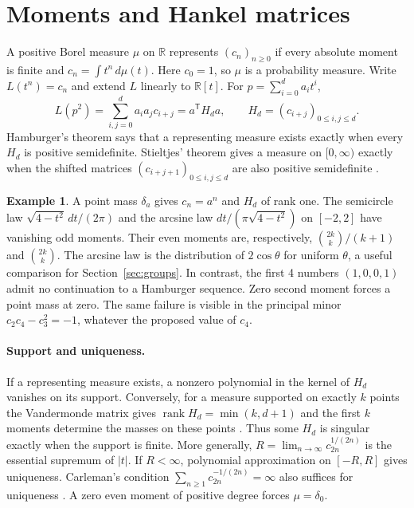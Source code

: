 \documentclass[11pt,reqno]{amsart}
\theoremstyle{definition}
\newtheorem{example}[theorem]{Example}
\newcommand{\RR}{\mathbb R}
\begin{document}
\section{Moments and Hankel matrices}\label{sec:moments}
A positive Borel measure $\mu$ on $\RR$ represents $(c_n)_{n\ge0}$ if every absolute moment is finite and $c_n=\int t^n\,d\mu(t)$. Here $c_0=1$, so $\mu$ is a probability measure. Write $L(t^n)=c_n$ and extend $L$ linearly to $\RR[t]$. For $p=\sum_{i=0}^d a_it^i$,
\[
 L(p^2)=\sum_{i,j=0}^d a_i a_j c_{i+j}=a^{\mathsf T}H_da,
 \qquad H_d=(c_{i+j})_{0\le i,j\le d}.
\]
Hamburger's theorem says that a representing measure exists exactly when every $H_d$ is positive semidefinite. Stieltjes' theorem gives a measure on $[0,\infty)$ exactly when the shifted matrices $(c_{i+j+1})_{0\le i,j\le d}$ are also positive semidefinite \cite[Theorems~3.8 and~3.12]{Sch}.

\begin{example}\label{ex:classical}
A point mass $\delta_a$ gives $c_n=a^n$ and $H_d$ of rank one. The semicircle law $\sqrt{4-t^2}\,dt/(2\pi)$ and the arcsine law $dt/(\pi\sqrt{4-t^2})$ on $[-2,2]$ have vanishing odd moments. Their even moments are, respectively, $\binom{2k}{k}/(k+1)$ and $\binom{2k}{k}$. The arcsine law is the distribution of $2\cos\theta$ for uniform $\theta$, a useful comparison for Section~\ref{sec:groups}. In contrast, the first 4 numbers $(1,0,0,1)$ admit no continuation to a Hamburger sequence. Zero second moment forces a point mass at zero. The same failure is visible in the principal minor $c_2c_4-c_3^2=-1$, whatever the proposed value of $c_4$.
\end{example}

\paragraph{Support and uniqueness.}\label{rem:support}
If a representing measure exists, a nonzero polynomial in the kernel of $H_d$ vanishes on its support. Conversely, for a measure supported on exactly $k$ points the Vandermonde matrix gives $\operatorname{rank}H_d=\min(k,d+1)$ and the first $k$ moments determine the masses on these points \cite[Proposition~3.9]{Sch}. Thus some $H_d$ is singular exactly when the support is finite. More generally, $R=\lim_{n\to\infty}c_{2n}^{1/(2n)}$ is the essential supremum of $|t|$. If $R<\infty$, polynomial approximation on $[-R,R]$ gives uniqueness. Carleman's condition $\sum_{n\ge1}c_{2n}^{-1/(2n)}=\infty$ also suffices for uniqueness \cite[Theorem~4.3(i)]{Sch}. A zero even moment of positive degree forces $\mu=\delta_0$.
\end{document}
